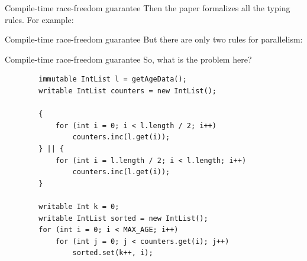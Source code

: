 \documentclass{beamer}
\begin{document}
\begin{frame}{Compile-time race-freedom guarantee}
	Then the paper formalizes all the typing rules. For example:
	\begin{center}
	\end{center}
\end{frame}


\begin{frame}{Compile-time race-freedom guarantee}
	But there are only two rules for parallelism:
	\begin{center}
	\end{center}
\end{frame}


\begin{frame}[fragile]{Compile-time race-freedom guarantee}
	So, what is the problem here?
	\begin{lstlisting}
        immutable IntList l = getAgeData();
        writable IntList counters = new IntList();
        
        {
            for (int i = 0; i < l.length / 2; i++)
                counters.inc(l.get(i));
        } || {
            for (int i = l.length / 2; i < l.length; i++)
                counters.inc(l.get(i));
        }
        
        writable Int k = 0;
        writable IntList sorted = new IntList();
        for (int i = 0; i < MAX_AGE; i++)
            for (int j = 0; j < counters.get(i); j++)
                sorted.set(k++, i);
	\end{lstlisting}
\end{frame}
\end{document}
